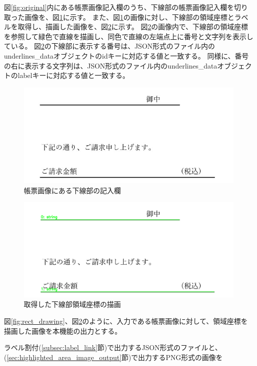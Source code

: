 図\ref{fig:original}内にある帳票画像記入欄のうち、下線部の帳票画像記入欄を切り取った画像を、図\ref{fig:underline_original}に示す。
また、図\ref{fig:underline_original}の画像に対し、下線部の領域座標とラベルを取得し、描画した画像を、図\ref{fig:underline_drawing}に示す。
図\ref{fig:underline_drawing}の画像内で、下線部の領域座標を参照して緑色で直線を描画し、同色で直線の左端点上に番号と文字列を表示している。
図\ref{fig:underline_drawing}の下線部に表示する番号は、JSON形式のファイル内のunderlines\_dataオブジェクトのidキーに対応する値と一致する。
同様に、番号の右に表示する文字列は、JSON形式のファイル内のunderlines\_dataオブジェクトのlabelキーに対応する値と一致する。

\begin{figure}[t]
    \begin{center}
        \includegraphics[width=15cm]{image/03-function/underline_original.jpg}
        \caption{帳票画像にある下線部の記入欄}
        \label{fig:underline_original}
    \end{center}
\end{figure}

\begin{figure}[t]
    \begin{center}
        \includegraphics[width=15cm]{image/03-function/underlines_with_label.png}
        \caption{取得した下線部領域座標の描画}
        \label{fig:underline_drawing}
    \end{center}
\end{figure}

図\ref{fig:rect_drawing}、図\ref{fig:underline_drawing}のように、入力である帳票画像に対して、領域座標を描画した画像を本機能の出力とする。

ラベル割付(\ref{subsec:label_link}節)で出力するJSON形式のファイルと、(\ref{sec:highlighted_area_image_output}節)で出力するPNG形式の画像を
